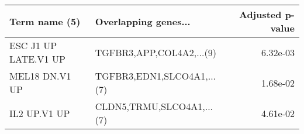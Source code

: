 \begin{tabular}{llr}
\toprule
       Term name (5) &       Overlapping genes... &  Adjusted p-value \\
\midrule
ESC J1 UP LATE.V1 UP &   TGFBR3,APP,COL4A2,...(9) &          6.32e-03 \\
      MEL18 DN.V1 UP & TGFBR3,EDN1,SLCO4A1,...(7) &          1.68e-02 \\
        IL2 UP.V1 UP &  CLDN5,TRMU,SLCO4A1,...(7) &          4.61e-02 \\
\bottomrule
\end{tabular}
